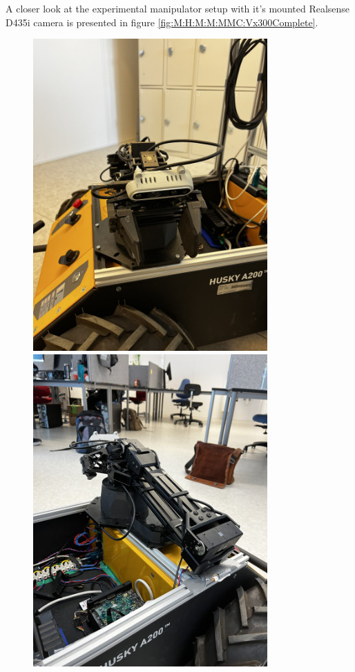 A closer look at the experimental manipulator setup with it's mounted Realsense D435i camera is presented in figure \ref{fig:M:H:M:M:MMC:Vx300Complete}.

\begin{figure}[htp!]
  \centering
  \begin{minipage}[b]{0.49\textwidth}
        \centering
        \includegraphics[angle=-90,width = 0.8\textwidth]{Figures/figVX300PhysComplete1.jpg}
  \end{minipage}
  \hfill
  \begin{minipage}[b]{0.49\textwidth}
    \centering
    \includegraphics[angle=-90,width = 0.8\textwidth]{Figures/figVX300PhysComplete5.jpg}

\end{minipage}
\end{figure}
